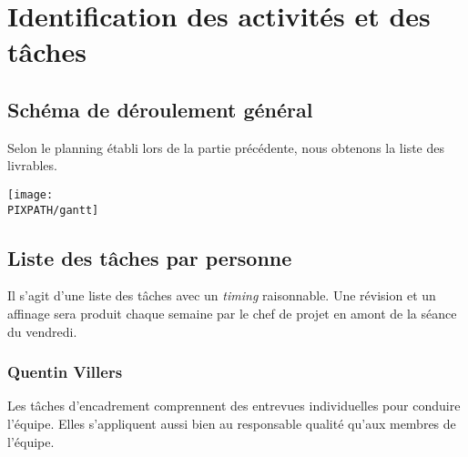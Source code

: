 \section{Identification des activités et des tâches}

\subsection{Schéma de déroulement général}

Selon le planning établi lors de la partie précédente, nous obtenons la liste des livrables.

\begin{center}
\texttt{[image: \\PIXPATH/gantt]}\hfill\\
\end{center}

\vfil
\pagebreak
\subsection{Liste des tâches par personne}

Il s'agit d'une liste des tâches avec un \textsl{timing} raisonnable.
Une révision et un affinage sera produit chaque semaine par le chef de projet
en amont de la séance du vendredi.

\subsubsection{Quentin Villers}

Les tâches d'encadrement comprennent des entrevues individuelles pour conduire l'équipe. 
Elles s'appliquent aussi bien au responsable qualité qu'aux membres de l'équipe. 

